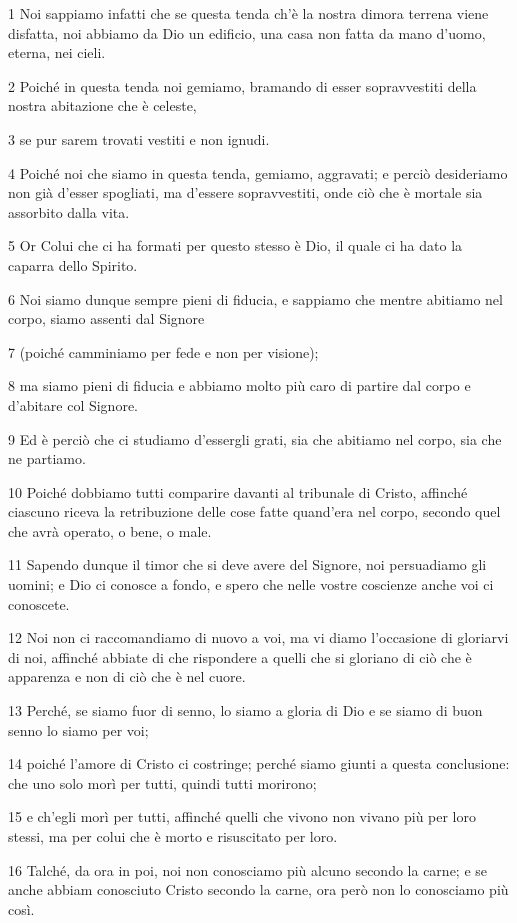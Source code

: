 \par 1 Noi sappiamo infatti che se questa tenda ch'è la nostra dimora terrena viene disfatta, noi abbiamo da Dio un edificio, una casa non fatta da mano d'uomo, eterna, nei cieli.
\par 2 Poiché in questa tenda noi gemiamo, bramando di esser sopravvestiti della nostra abitazione che è celeste,
\par 3 se pur sarem trovati vestiti e non ignudi.
\par 4 Poiché noi che siamo in questa tenda, gemiamo, aggravati; e perciò desideriamo non già d'esser spogliati, ma d'essere sopravvestiti, onde ciò che è mortale sia assorbito dalla vita.
\par 5 Or Colui che ci ha formati per questo stesso è Dio, il quale ci ha dato la caparra dello Spirito.
\par 6 Noi siamo dunque sempre pieni di fiducia, e sappiamo che mentre abitiamo nel corpo, siamo assenti dal Signore
\par 7 (poiché camminiamo per fede e non per visione);
\par 8 ma siamo pieni di fiducia e abbiamo molto più caro di partire dal corpo e d'abitare col Signore.
\par 9 Ed è perciò che ci studiamo d'essergli grati, sia che abitiamo nel corpo, sia che ne partiamo.
\par 10 Poiché dobbiamo tutti comparire davanti al tribunale di Cristo, affinché ciascuno riceva la retribuzione delle cose fatte quand'era nel corpo, secondo quel che avrà operato, o bene, o male.
\par 11 Sapendo dunque il timor che si deve avere del Signore, noi persuadiamo gli uomini; e Dio ci conosce a fondo, e spero che nelle vostre coscienze anche voi ci conoscete.
\par 12 Noi non ci raccomandiamo di nuovo a voi, ma vi diamo l'occasione di gloriarvi di noi, affinché abbiate di che rispondere a quelli che si gloriano di ciò che è apparenza e non di ciò che è nel cuore.
\par 13 Perché, se siamo fuor di senno, lo siamo a gloria di Dio e se siamo di buon senno lo siamo per voi;
\par 14 poiché l'amore di Cristo ci costringe; perché siamo giunti a questa conclusione: che uno solo morì per tutti, quindi tutti morirono;
\par 15 e ch'egli morì per tutti, affinché quelli che vivono non vivano più per loro stessi, ma per colui che è morto e risuscitato per loro.
\par 16 Talché, da ora in poi, noi non conosciamo più alcuno secondo la carne; e se anche abbiam conosciuto Cristo secondo la carne, ora però non lo conosciamo più così.
